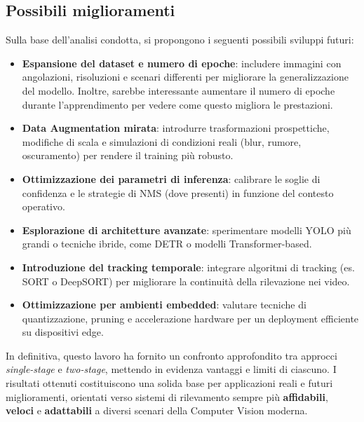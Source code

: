 \documentclass[12pt]{article}
\begin{document}
\subsection{Possibili miglioramenti}

Sulla base dell’analisi condotta, si propongono i seguenti possibili sviluppi futuri:
\begin{itemize}
    \item \textbf{Espansione del dataset e numero di epoche}: includere immagini con angolazioni, risoluzioni e scenari differenti per migliorare la generalizzazione del modello. Inoltre, sarebbe interessante aumentare il numero di epoche durante l'apprendimento per vedere come questo migliora le prestazioni. 
    
    \item \textbf{Data Augmentation mirata}: introdurre trasformazioni prospettiche, modifiche di scala e simulazioni di condizioni reali (blur, rumore, oscuramento) per rendere il training più robusto.
    
    \item \textbf{Ottimizzazione dei parametri di inferenza}: calibrare le soglie di confidenza e le strategie di NMS (dove presenti) in funzione del contesto operativo.
    
    \item \textbf{Esplorazione di architetture avanzate}: sperimentare modelli YOLO più grandi o tecniche ibride, come DETR o modelli Transformer-based.
    
    \item \textbf{Introduzione del tracking temporale}: integrare algoritmi di tracking (es. SORT o DeepSORT) per migliorare la continuità della rilevazione nei video.
    
    \item \textbf{Ottimizzazione per ambienti embedded}: valutare tecniche di quantizzazione, pruning e accelerazione hardware per un deployment efficiente su dispositivi edge.
\end{itemize}
\vspace{0.5em}
In definitiva, questo lavoro ha fornito un confronto approfondito tra approcci \textit{single-stage} e \textit{two-stage}, mettendo in evidenza vantaggi e limiti di ciascuno. I risultati ottenuti costituiscono una solida base per applicazioni reali e futuri miglioramenti, orientati verso sistemi di rilevamento sempre più \textbf{affidabili}, \textbf{veloci} e \textbf{adattabili} a diversi scenari della Computer Vision moderna.
\newpage
\end{document}
